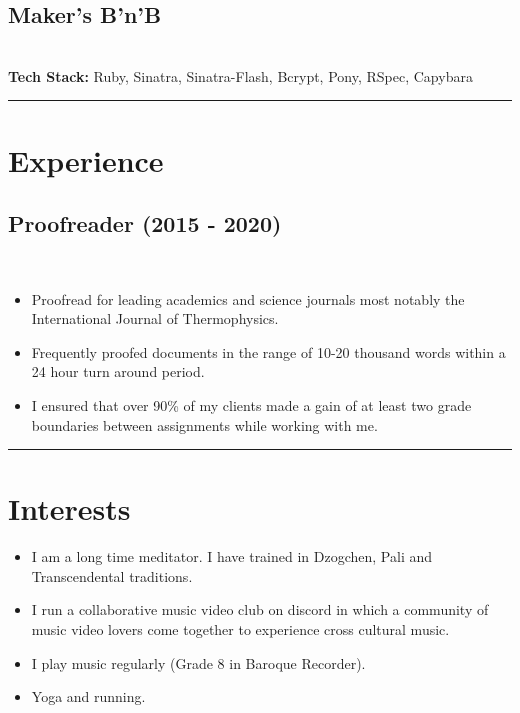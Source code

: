 \documentclass[12pt]{IEEEtran}
\newcommand{\cvrule}{\noindent\rule{8.5cm}{0.4pt}}
\begin{document}
\subsection*{Maker's B'n'B}
 \\
\textbf{Tech Stack:} Ruby, Sinatra, Sinatra-Flash, Bcrypt, Pony, RSpec, Capybara %

\cvrule
\vskip 0.35in

\section*{\textbf{Experience}}

\subsection*{Proofreader (2015 - 2020)}
\\[1pt]
\begin{itemize}
\item Proofread for leading academics and science journals most notably the International Journal of Thermophysics.
\item Frequently proofed documents in the range of 10-20 thousand words within a 24 hour turn around period.
\item I ensured that over 90\% of my clients made a gain of at least two grade boundaries between assignments while working with me.
\end{itemize}

\cvrule
\vskip 0.35in
\section*{I\textbf{nterests}}

\begin{itemize}
\item I am a long time meditator. I have trained in Dzogchen, Pali and Transcendental traditions.
\item I run a collaborative music video club on discord in which a community of music video lovers come together to experience cross cultural music.
\item I play music regularly (Grade 8 in Baroque Recorder).
\item Yoga and running.
\end{itemize}
\end{document}
